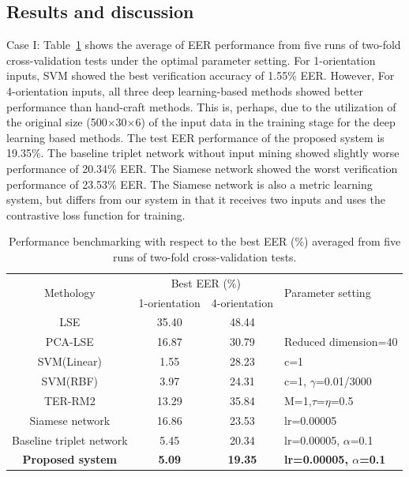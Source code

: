 \documentclass{sig-alternate-05-2015}
\begin{document}
\subsection{Results and discussion}

Case I: Table~\ref{tab3} shows the average of EER performance from five runs of two-fold cross-validation tests under the optimal parameter setting. For 1-orientation inputs, SVM showed the best verification accuracy of 1.55\% EER. However, For 4-orientation inputs, all three deep learning-based methods showed better performance than hand-craft methods. This is, perhaps, due to the utilization of the original size (500$\times$30$\times$6) of the input data in the training stage for the deep learning based methods. The test EER performance of the proposed system is 19.35\%. The baseline triplet network without input mining showed slightly worse performance of 20.34\% EER. The Siamese network showed the worst verification performance of 23.53\% EER. The Siamese network is also a metric learning system, but differs from our system in that it receives two inputs and uses the contrastive loss function for training. 
\begin{table}
\centering
    \caption{Performance benchmarking with respect to the best EER (\%) averaged from five runs of two-fold cross-validation tests.}
    \label{tab3}
    \begin{tabular}{|c|c|c|l|} \hline
    \multirow{2}{*}{Methology} & \multicolumn{2}{|c|}{Best EER (\%)} & \multirow{2}{*}{Parameter setting} \\ \cline{2-3}           & 1-orientation & 4-orientation     &    \\ \hline
    LSE                                    & 35.40 & 48.44           &                           \\  \hline
    PCA-LSE                                & 16.87 & 30.79           & Reduced dimension=40        \\  \hline
    SVM(Linear)                            & 1.55 & 28.23            & c=1                        \\  \hline
    SVM(RBF)                               & 3.97 & 24.31            & c=1, $\gamma$=0.01/3000    \\  \hline
    TER-RM2                                & 13.29 & 35.84          & M=1,$\tau$=$\eta$=0.5      \\ \hline
    Siamese network                        & 16.86 & 23.53           & lr=0.00005                 \\  \hline
    Baseline triplet network               & 5.45 & 20.34           & lr=0.00005, $\alpha$=0.1   \\  \hline
    \textbf{Proposed system}               & \textbf{5.09} & \textbf{19.35}           & \textbf{lr=0.00005, $\alpha$=0.1}   \\ \hline
    \end{tabular}
\end{table}
\end{document}
